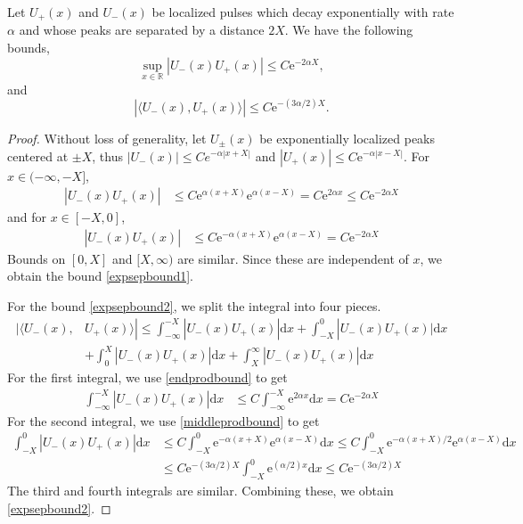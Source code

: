 \documentclass[review,onefignum,onetabnum]{siamart171218}
\newcommand{\R}{\mathbb{R}}
\newcommand{\rmd}{\mathrm{d}}
\newcommand{\rme}{\mathrm{e}}
\begin{document}
\begin{lemma}\label{expseplemma}
Let $U_+(x)$ and $U_-(x)$ be localized pulses which decay exponentially with rate $\alpha$ and whose peaks are separated by a distance $2 X$. We have the following bounds,
\begin{equation}\label{expsepbound1}
\sup_{x \in \R} | U_-(x) U_+(x)|\leq C \rme^{-2 \alpha X},
\end{equation}
and
\begin{equation}\label{expsepbound2}
|\langle U_-(x), U_+(x) \rangle |\leq C \rme^{-(3 \alpha/2) X}.
\end{equation}
\end{lemma}

\begin{proof}
Without loss of generality, let $U_\pm(x)$ be exponentially localized peaks centered at $\pm X$, thus $|U_-(x)| \leq C e^{-\alpha|x + X|}$ and $|U_+(x)| \leq C \rme^{-\alpha|x - X|}$. For $x \in (-\infty, -X]$,
\begin{align}\label{endprodbound}
| U_-(x) U_+(x) | &\leq C \rme^{\alpha(x + X)} \rme^{\alpha(x - X)} = C \rme^{2 \alpha x} \leq C \rme^{-2 \alpha X}
\end{align}
and for $x \in [-X, 0]$,
\begin{align}\label{middleprodbound}
| U_-(x) U_+(x) | &\leq C \rme^{-\alpha(x + X)} \rme^{\alpha(x - X)} = C \rme^{-2 \alpha X}
\end{align}
Bounds on $[0, X]$ and $[X, \infty)$ are similar. Since these are independent of $x$, we obtain the bound \cref{expsepbound1}.

For the bound \cref{expsepbound2}, we split the integral into four pieces.
\begin{equation}
\begin{aligned}
| \langle U_-(x), &U_+(x) \rangle |
\leq \int_{-\infty}^{-X} |U_-(x) U_+(x)| \rmd x + \int_{-X}^0 |U_-(x) U_+(x)|\rmd x \\
&+\int_0^X |U_-(x) U_+(x)| \rmd x +\int_X^\infty |U_-(x) U_+(x)| \rmd x
\end{aligned}
\end{equation}
For the first integral, we use \cref{endprodbound} to get
\begin{align*}
\int_{-\infty}^{-X} |U_-(x) U_+(x)| \rmd x &\leq C \int_{-\infty}^{-X} \rme^{2 \alpha x} \rmd x = C \rme^{-2 \alpha X}
\end{align*}
For the second integral, we use \cref{middleprodbound} to get
\begin{align*}
\int_{-X}^0 |U_-(x) U_+(x)| \rmd x &\leq C \int_{-X}^0 \rme^{-\alpha(x + X)} \rme^{\alpha(x - X)} \rmd x \leq C \int_{-X}^0 \rme^{-\alpha(x + X)/2}\rme^{\alpha(x - X)} \rmd x \\
&\leq C \rme^{-(3 \alpha/2) X } \int_{-X}^0 \rme^{(\alpha/2)x} \rmd x \leq C \rme^{-(3 \alpha/2) X }
\end{align*}
The third and fourth integrals are similar. Combining these, we obtain \cref{expsepbound2}.
\end{proof}
\end{document}

